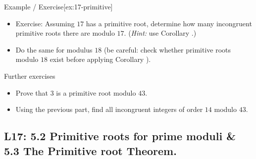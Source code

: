 \documentclass[10pt]{article}
\theoremstyle{definition}
\theoremstyle{plain}
\numberwithin{equation}{section}
\begin{document}
\begin{define}{Example / Exercise}[ex:17-primitive]
\begin{itemize}
  \item Exercise: Assuming $17$ has a primitive root, determine how many incongruent primitive roots there are modulo $17$. (\emph{Hint:} use Corollary .)
  \item Do the same for modulus $18$ (be careful: check whether primitive roots modulo $18$ exist before applying Corollary ).
\end{itemize}
\end{define}

\begin{define}{Further exercises}
\begin{itemize}
  \item Prove that $3$ is a primitive root modulo $43$.
  \item Using the previous part, find all incongruent integers of order $14$ modulo $43$.
\end{itemize}
\end{define}






\newpage
\subsection{L17:  5.2 Primitive roots for prime moduli \& 5.3 The Primitive root Theorem.}
\end{document}
